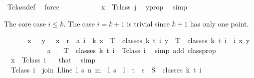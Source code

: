 \begin{isabellebody}
\ T{\isacharunderscore}{\kern0pt}class{\isacharunderscore}{\kern0pt}def\ \isamarkupfalse%
\ force\isanewline
\ \ \ \ \ \ \ \ \isamarkupfalse%
\ \isamarkupfalse%
\ {\isachardoublequoteopen}x\ {\isasymin}\ T{\isacharunderscore}{\kern0pt}class\ j{\isachardoublequoteclose}\ \isamarkupfalse%
\ y{\isacharunderscore}{\kern0pt}prop\ \isamarkupfalse%
\ simp\isanewline
\ \ \ \ \ \ \isamarkupfalse%
\isanewline
\ \ \ \ \isamarkupfalse%
%
\begin{isamarkuptext}%
The core case $i \leq k$. The case $i = k+1$ is trivial since $k+1$ has only one point.%
\end{isamarkuptext}\isamarkuptrue%
\ \ \ \ \isamarkupfalse%
\ {\isachardoublequoteopen}{\isasymchi}\ x\ {\isacharequal}{\kern0pt}\ {\isasymchi}\ y\ {\isasymand}\ {\isasymchi}\ x\ {\isacharless}{\kern0pt}\ r{\isachardoublequoteclose}\ \ a{\isacharcolon}{\kern0pt}\ {\isachardoublequoteopen}i\ {\isasymle}\ k{\isachardoublequoteclose}\ {\isachardoublequoteopen}x\ {\isasymin}\ T\ {\isacharbackquote}{\kern0pt}\ classes\ {\isacharparenleft}{\kern0pt}k{\isacharplus}{\kern0pt}{}{\isacharparenright}{\kern0pt}\ t\ i{\isachardoublequoteclose}\ {\isachardoublequoteopen}y\ {\isasymin}\ T\ {\isacharbackquote}{\kern0pt}\ classes\ {\isacharparenleft}{\kern0pt}k{\isacharplus}{\kern0pt}{}{\isacharparenright}{\kern0pt}\ t\ i{\isachardoublequoteclose}\ \ i\ x\ y\isanewline
\ \ \ \ \isamarkupfalse%
{\isacharminus}{\kern0pt}\isanewline
\ \ \ \ \ \ \isamarkupfalse%
\ a\ \isamarkupfalse%
\ {\isacharasterisk}{\kern0pt}{\isacharcolon}{\kern0pt}\ {\isachardoublequoteopen}T\ {\isacharbackquote}{\kern0pt}\ classes\ {\isacharparenleft}{\kern0pt}k{\isacharplus}{\kern0pt}{}{\isacharparenright}{\kern0pt}\ t\ i\ {\isacharequal}{\kern0pt}\ T{\isacharunderscore}{\kern0pt}class\ i{\isachardoublequoteclose}\ \isamarkupfalse%
\ {\isacharparenleft}{\kern0pt}simp\ add{\isacharcolon}{\kern0pt}\ classprop{\isacharparenright}{\kern0pt}\isanewline
\ \ \ \ \ \ \isamarkupfalse%
\ \isamarkupfalse%
\ \ {\isachardoublequoteopen}x\ {\isasymin}\ T{\isacharunderscore}{\kern0pt}class\ i\ {\isachardoublequoteclose}\ \isamarkupfalse%
\ that\ \isamarkupfalse%
\ simp\isanewline
\ \ \ \ \ \ \isamarkupfalse%
\ \isamarkupfalse%
\ {\isacharasterisk}{\kern0pt}{\isacharasterisk}{\kern0pt}{\isacharcolon}{\kern0pt}\ {\isachardoublequoteopen}T{\isacharunderscore}{\kern0pt}class\ i\ {\isacharequal}{\kern0pt}\ {\isacharbraceleft}{\kern0pt}join\ {\isacharparenleft}{\kern0pt}L{\isacharunderscore}{\kern0pt}line\ l{\isacharparenright}{\kern0pt}\ s\ n\ m\ {\isacharbar}{\kern0pt}\ l\ s\ {\isachardot}{\kern0pt}\ l\ {\isasymin}\ {\isacharbraceleft}{\kern0pt}{\isachardot}{\kern0pt}{\isachardot}{\kern0pt}{\isacharless}{\kern0pt}t{\isacharbraceright}{\kern0pt}\ {\isasymand}\ s\ {\isasymin}\ S\ {\isacharbackquote}{\kern0pt}\ {\isacharparenleft}{\kern0pt}classes\ k\ t\ i{\isacharparenright}{\kern0pt}{\isacharbraceright}{\kern0pt}{\isachardoublequoteclose}\ \isamarkupfalse%

\end{isabellebody}

